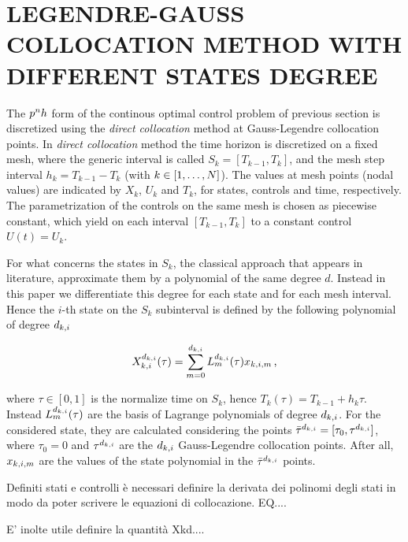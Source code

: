 \section*{LEGENDRE-GAUSS COLLOCATION METHOD WITH DIFFERENT STATES DEGREE}
The $p^{n}h$ form of the continous optimal control problem of previous section is discretized using the \emph{direct collocation} method at Gauss-Legendre collocation points. In \emph{direct collocation} method the time horizon is discretized on a fixed mesh, where the generic interval is called $S_{k} = [T_{k-1}, T_{k}]$, and the mesh step interval $h_{k} = T_{k-1} - T_{k}$ (with $k \in [1,\dots,N]$). The values at mesh points (nodal values) are indicated by $X_{k}$, $U_{k}$ and $T_{k}$, for  states, controls and time, respectively.
The parametrization of the controls on the same mesh is chosen as piecewise constant, which yield on each interval $[T_{k-1}, T_{k}]$ to a constant control $U(t) = U_{k}$.

For what concerns the states in $S_{k}$, the classical approach that appears in literature, approximate them by a polynomial of the same degree $d$.
Instead in this paper we differentiate this degree for each state and for each mesh interval. Hence the $i$-th state on the $S_{k}$ subinterval is defined by the following polynomial of degree $d_{k,i}$

\begin{equation}
X_{k,i}^{d_{k,i}} (\tau) = \sum_{m=0}^{d_{k,i}} L_{m}^{d_{k,i}}(\tau)x_{k,i,m} \,\text{,} 
\end{equation}


where $\tau \in [0,1]$ is the normalize time on $S_k$, hence $T_k(\tau) = T_{k-1} + h_k\tau$.
Instead $L_{m}^{d_{k,i}} (\tau)$ are the basis of Lagrange polynomials of degree $d_{k,i}$. For the considered state, they are calculated considering the points $\bar{\tau}^{d_{k,i}} = [\tau_{0}, \tau^{d_{k,i}}]$, where $\tau_{0} = 0$ and $\tau^{d_{k,i}}$ are the $d_{k,i}$ Gauss-Legendre collocation points.
After all, $x_{k,i,m}$ are the values of the state polynomial in the $\bar{\tau}^{d_{k,i}}$ points.

Definiti stati e controlli è necessari definire la derivata dei polinomi degli stati in modo da poter scrivere le equazioni di collocazione.
EQ....

E' inolte utile definire la quantità Xkd....







